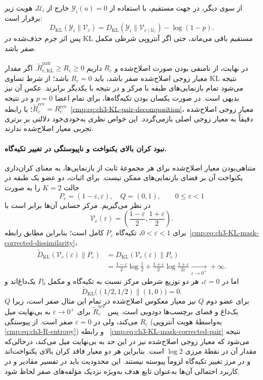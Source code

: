 از سوی دیگر، در جهت مستقیم، با استفاده از
$\mathscr Y_i(u)=0$ خارج از $\mathcal U_i$،
هویت زیر برقرار است:
\begin{equation}\label{eq:app-geometry-KL-forward-mask}
D_{\mathrm{KL}}(\mathscr Y_i\|\mathcal V_c)
=D_{\mathrm{KL}}(\mathscr Y_i\|\mathcal V_{c\mid\mathcal U_i})
-\log(1-p).
\end{equation}
پس اثر جرم حذف‌شده در KL مستقیم باقی می‌ماند،
حتی اگر آنتروپی شرطی مکمل صفر باشد.

در نهایت، از نامنفی بودن صورت اصلاح‌شده و $R_c$
داریم $\widetilde R_{c,\mathrm{KL}}^{\mathrm{pair}}\ge R_c\ge0$.
اگر مقدار معیار زوجی اصلاح‌شده صفر باشد، باید
$R_c=0$ باشد؛ از شرط تساوی KL نتیجه می‌شود تمام
بازنمایی‌های طبقه با مرکز و در نتیجه با یکدیگر
برابرند. عکس آن نیز بدیهی است. در صورت یکسان بودن
تکیه‌گاه‌ها، برای تمام اعضا $p=0$ و در نتیجه
$\widetilde R_c^{\mathrm{rev}}=R_c^{\mathrm{rev}}$؛
با رابطه~\eqref{cmp:eq:ch3-KL-pair-decomposition}،
معیار زوجی اصلاح‌شده دقیقاً به معیار زوجی اصلی
بازمی‌گردد. این خواص نظری به‌خودی‌خود دلالتی بر
برتری تجربی معیار اصلاح‌شده ندارند.

\paragraph{نبود کران بالای یکنواخت و ناپیوستگی در تغییر تکیه‌گاه.}
متناهی‌بودن معیار اصلاح‌شده برای هر مجموعهٔ ثابت
از بازنمایی‌ها، به معنای کران‌داری یکنواخت آن بر
فضای بازنمایی‌های ممکن نیست. برای اثبات، دو عضو
یک طبقه در حالت $K=2$ را به صورت
\[
P_\varepsilon=(1-\varepsilon,\varepsilon),
\quad Q=(0,1),
\qquad 0\le\varepsilon<1
\]
در نظر می‌گیریم. مرکز حسابی آن‌ها برابر است با
\[
\mathcal V_c(\varepsilon)=
\left(\frac{1-\varepsilon}{2},\frac{1+\varepsilon}{2}\right).
\]
برای $0<\varepsilon<1$، تکیه‌گاه $P_\varepsilon$
کامل است؛ بنابراین مطابق
رابطه~\eqref{cmp:eq:ch3-KL-mask-corrected-dissimilarity}،
\[
\begin{aligned}
\widetilde D_{\mathrm{KL}}(\mathcal V_c(\varepsilon)\|P_\varepsilon)
&=D_{\mathrm{KL}}(\mathcal V_c(\varepsilon)\|P_\varepsilon)\\
&=\frac{1-\varepsilon}{2}\log\frac12
+\frac{1+\varepsilon}{2}\log\frac{1+\varepsilon}{2\varepsilon}
\xrightarrow[\varepsilon\to0^+]{}+\infty.
\end{aligned}
\]
اما در $\varepsilon=0$، هر دو توزیع شرطی مرکز
نسبت به تکیه‌گاه و مکمل $P_0$ یک‌داغ‌اند و
\[
\widetilde D_{\mathrm{KL}}\bigl((1/2,1/2)\|(1,0)\bigr)=0.
\]
برای عضو دوم $Q$ نیز معیار معکوس اصلاح‌شده در تمام
این مثال صفر است، زیرا $Q$ یک‌داغ و فضای برچسب‌ها
دودویی است. پس $\widetilde R_c^{\mathrm{rev}}$
برای $\varepsilon\to0^+$ به بی‌نهایت میل می‌کند،
ولی در $\varepsilon=0$ صفر است. از پیوستگی
$R_c$ (به‌واسطهٔ هویت آنتروپی
\eqref{cmp:eq:ch3-R-entropy}) و رابطه~
\eqref{cmp:eq:ch3-KL-mask-corrected-pair} نتیجه می‌شود
که معیار زوجی اصلاح‌شده نیز در این حد به
بی‌نهایت میل می‌کند، درحالی‌که مقدار آن در نقطهٔ
مرزی $\log2$ است. بنابراین هر دو معیار فاقد
کران بالای یکنواخت‌اند و در مرز تغییر تکیه‌گاه
لزوماً پیوسته نیستند. این محدودیت باید در تفسیر
مقادیر و در کاربرد احتمالی آن‌ها به‌عنوان تابع هدف
به‌ویژه نزدیک مؤلفه‌های صفر لحاظ شود.


